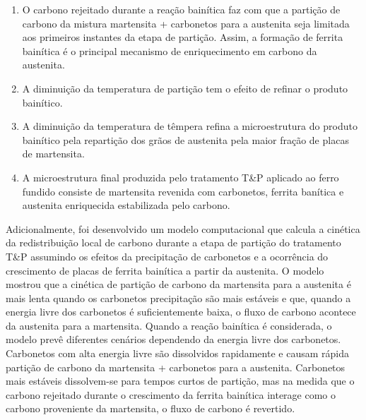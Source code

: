 \begin{enumerate}
  \item O carbono rejeitado durante a reação bainítica faz com que a partição de carbono da mistura martensita + carbonetos para a austenita seja limitada aos primeiros instantes da etapa de partição. Assim, a formação de ferrita bainítica é o principal mecanismo de enriquecimento em carbono da austenita.

  \item A diminuição da temperatura de partição tem o efeito de refinar o produto bainítico. 

  \item A diminuição da temperatura de têmpera refina a microestrutura do produto bainítico pela repartição dos grãos de austenita pela maior fração de placas de martensita.

  \item A microestrutura final produzida pelo tratamento T\&P aplicado ao ferro fundido consiste de martensita revenida com carbonetos, ferrita banítica e austenita enriquecida estabilizada pelo carbono.
\end{enumerate}

Adicionalmente, foi desenvolvido um modelo computacional que calcula a cinética da redistribuição local de carbono durante a etapa de partição do tratamento T\&P assumindo os efeitos da precipitação de carbonetos e a ocorrência do crescimento de placas de ferrita bainítica a partir da austenita. O modelo mostrou que a cinética de partição de carbono da martensita para a austenita é mais lenta quando os carbonetos precipitação são mais estáveis e que, quando a energia livre dos carbonetos é suficientemente baixa, o fluxo de carbono acontece da austenita para a martensita.
Quando a reação bainítica é considerada, o modelo prevê diferentes cenários dependendo da energia livre dos carbonetos. Carbonetos com alta energia livre são dissolvidos rapidamente e causam rápida partição de carbono da martensita + carbonetos para a austenita. Carbonetos mais estáveis dissolvem-se para tempos curtos de partição, mas na medida que o carbono rejeitado durante o crescimento da ferrita bainítica interage como o carbono proveniente da martensita, o fluxo de carbono é revertido. 






